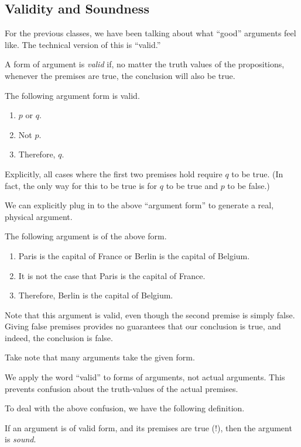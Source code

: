 \documentclass[../notes.tex]{subfiles}
\begin{document}
\subsection{Validity and Soundness}
For the previous classes, we have been talking about what ``good'' arguments feel like. The technical version of this is ``valid.''
\begin{definition}[Valid]
	A form of argument is \textit{valid} if, no matter the truth values of the propositions, whenever the premises are true, the conclusion will also be true.
\end{definition}
\begin{example}
	The following argument form is valid.
	\begin{enumerate}
		\item $p$ or $q$.
		\item Not $p$.
		\item Therefore, $q$.
	\end{enumerate}
	Explicitly, all cases where the first two premises hold require $q$ to be true. (In fact, the only way for this to be true is for $q$ to be true and $p$ to be false.)
\end{example}
We can explicitly plug in to the above ``argument form'' to generate a real, physical argument.
\begin{example}
	The following argument is of the above form.
	\begin{enumerate}
		\item Paris is the capital of France or Berlin is the capital of Belgium.
		\item It is not the case that Paris is the capital of France.
		\item Therefore, Berlin is the capital of Belgium.
	\end{enumerate}
	Note that this argument is valid, even though the second premise is simply false. Giving false premises provides no guarantees that our conclusion is true, and indeed, the conclusion is false.
\end{example}
Take note that many arguments take the given form.
\begin{warn}
	We apply the word ``valid'' to forms of arguments, not actual arguments. This prevents confusion about the truth-values of the actual premises.
\end{warn}
To deal with the above confusion, we have the following definition.
\begin{definition}[Sound]
	If an argument is of valid form, and its premises are true (!), then the argument is \textit{sound}.
\end{definition}
\end{document}

